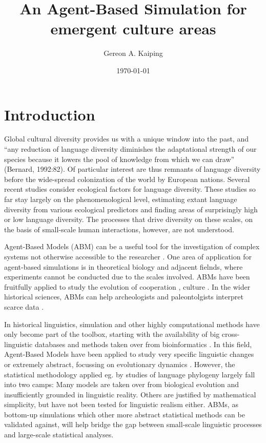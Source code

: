 \documentclass[a4paper,12pt]{scrartcl}
\title{An Agent-Based Simulation for emergent culture areas}
\date{\today}
\author[1]{Gereon A. Kaiping}
\affil[1]{Geographic Information Science Center, Universität Zürich, CH}
\begin{document}
\maketitle
\section{Introduction}
Global cultural diversity provides us with a unique window into the past, and
“any reduction of language diversity diminishes the adaptational strength of our
species because it lowers the pool of knowledge from which we can draw”
(Bernard, 1992:82). %
Of particular interest are thus remnants of language diversity before the
wide-spread colonization of the world by European nations. Several recent
studies
\parencite{gavin2017processbased,pachecocoelho2019drivers,hua2019ecological}
consider ecological factors for language diversity. These studies so far stay
largely on the phenomenological level, estimating extant language diversity from
various ecological predictors and finding areas of surprisingly high or low
language diversity. The processes that drive diversity on these scales, on the
basis of small-scale human interactions, however, are not understood.

Agent-Based Models (ABM) \parencite{} can be a useful tool for the investigation
of complex systems not otherwise accessible to the researcher \parencite{}. One
area of application for agent-based simulations is in theoretical biology and
adjacent fielnds, where experiments cannot be conducted due to the scales
involved. ABMs have been fruitfully applied to study the evolution of
cooperation \parencite{}, culture \parencite{}. In the wider historical
sciences, ABMs can help archeologists and paleontolgists interpret scarce data
\parencite{cegielski2016rethinking,barcelo2016simulating}.

In historical linguistics, simulation and other highly computational methods
have only become part of the toolbox, starting with the availability of big
cross-linguistic databases and methods taken over from bioinformatics
\parencite{}. In this field, Agent-Based Models have been applied to study very
specific linguistic changes
\cite{bloem2015agentbased,feltgen2017modeling,grim2011simulating,radulescu2016modelling,vantrijp2016evolution}
or extremely abstract, focussing on evolutionary dynamics
\cite{arita1998evolution,castello2013agentbased,javarone2014competitive}.
However, the statistical methodology applied eg. by studies of language
phylogeny largely fall into two camps: Many models are taken over from
biological evolution and insufficiently grounded in linguistic reality. Others
are justified by mathematical simplicity, but have not been tested for
linguistic realism either. ABMs, as bottom-up simulations which other more
abstract statistical methods can be validated against, will help bridge the gap
between small-scale linguistic processes and large-scale statistical analyses.
\end{document}
